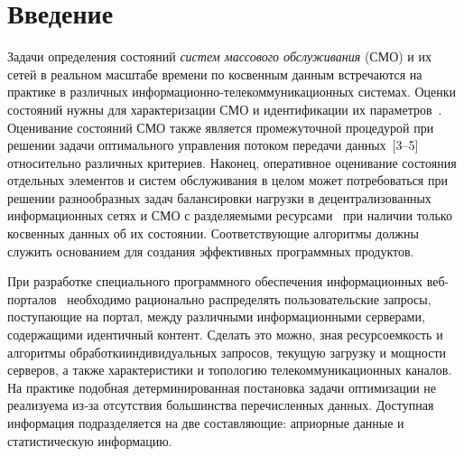 



\thispagestyle{headings}

\begin{multicols}{2}

\label{st\stat}

 \section{Введение}

 Задачи определения состояний {\it сис\-тем массового обслуживания} (СМО)
 и их сетей в реальном масштабе времени по косвенным данным встречаются на
 практике в различных ин\-фор\-ма\-ци\-он\-но-те\-ле\-ком\-му\-ни\-ка\-ци\-он\-ных
 сис\-те\-мах. Оценки
 состояний нужны для характеризации СМО и идентификации их параметров~\cite{IvKK_82, KR_88}.
 Оценивание состояний СМО также является промежуточной процедурой при решении задачи
 оптимального управления потоком передачи данных~[3--5]
 относительно различных критериев. Наконец, оперативное оценивание состояния
 отдельных элементов и систем обслуживания в целом может потребоваться при
 решении разнообразных задач балансировки нагрузки в децентрализованных
 информационных сетях и СМО с разделяемыми ресурсами~\cite{AKU_05,AAP_11}
 при наличии только косвенных данных об их состоянии. Соответствующие
 алгоритмы должны служить основанием для создания эффективных программных
 продуктов.

 При разработке специального программного обеспечения информационных веб-пор\-та\-лов~\cite{Bosov_09, Bosov_11}
 необходимо рационально распределять пользовательские запросы, поступающие на портал, между различными
 информационными серверами, содержащими идентичный контент. Сделать это можно, %
  зная ресурсоемкость и
 алгоритмы обработки\linebreak индивидуаль\-ных запросов, текущую загрузку и мощ\-ности серверов,
 а также характеристики и топологию телекоммуникационных каналов. На практике
 подобная детерминированная постановка задачи оптимизации не реализуема из-за
 отсутствия большинства перечисленных данных. Доступная информация подразделяется
 на две составляющие: априорные данные и статистическую информацию.


\end{multicols}
